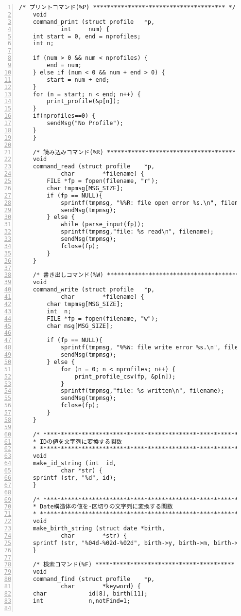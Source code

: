 \documentclass[11pt]{jarticle}
\begin{document}
\begin{lstlisting}[caption=サーバ側プログラム,label=server,numbers=left]
    /* プリントコマンド(%P) ************************************** */
    void
    command_print (struct profile	*p,
            int		num) {
    int	start = 0, end = nprofiles;
    int	n;
    
    if (num > 0 && num < nprofiles) {
        end = num;
    } else if (num < 0 && num + end > 0) {
        start = num + end;
    }
    for (n = start; n < end; n++) {
        print_profile(&p[n]);
    }
    if(nprofiles==0) {
        sendMsg("No Profile");
    }
    }

    /* 読み込みコマンド(%R) ************************************* */
    void
    command_read (struct profile	*p,
            char		*filename) {
        FILE *fp = fopen(filename, "r");
        char tmpmsg[MSG_SIZE];
        if (fp == NULL){
            sprintf(tmpmsg, "%%R: file open error %s.\n", filename);
            sendMsg(tmpmsg);
        } else {
            while (parse_input(fp));
            sprintf(tmpmsg,"file: %s read\n", filename);
            sendMsg(tmpmsg);
            fclose(fp);
        }
    }

    /* 書き出しコマンド(%W) ************************************** */
    void
    command_write (struct profile	*p,
            char		*filename) {
        char tmpmsg[MSG_SIZE];
        int  n;
        FILE *fp = fopen(filename, "w");
        char msg[MSG_SIZE];

        if (fp == NULL){
            sprintf(tmpmsg, "%%W: file write error %s.\n", filename);
            sendMsg(tmpmsg);
        } else {
            for (n = 0; n < nprofiles; n++) {
                print_profile_csv(fp, &p[n]);
            }
            sprintf(tmpmsg,"file: %s written\n", filename);
            sendMsg(tmpmsg);
            fclose(fp);
        }
    }

    /* ********************************************************** *
    * IDの値を文字列に変換する関数
    * ********************************************************** */
    void
    make_id_string (int  id,
            char *str) {
    sprintf (str, "%d", id);
    }

    /* ******************************************************** *
    * Date構造体の値を-区切りの文字列に変換する関数
    * ********************************************************* */
    void
    make_birth_string (struct date *birth,
            char        *str) {
    sprintf (str, "%04d-%02d-%02d", birth->y, birth->m, birth->d);
    }

    /* 検索コマンド(%F) **************************************** */
    void
    command_find (struct profile	*p,
            char		*keyword) {
    char            id[8], birth[11];
    int             n,notFind=1;


\end{lstlisting}
\end{document}
